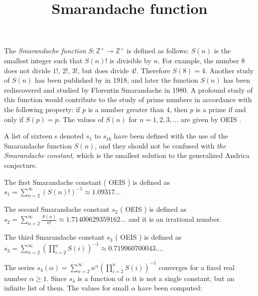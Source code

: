 \documentclass[12pt]{article}
\begin{document}
\title{Smarandache function}

The \emph{Smarandache function} $S \colon \mathbb{Z}^+ \to \mathbb{Z}^+$ is defined as follows: $S(n)$ is the smallest integer such that $S(n)!$ is divisible by $n$. For example, the number 8 does not divide $1!$, $2!$, $3!$, but does divide $4!$. Therefore $S(8)=4$. Another study of $S(n)$ has been published by  in 1918, and later the function $S(n)$ has been rediscovered and studied by Florentin Smarandache in 1980. A profound study of this function would contribute to the study of prime numbers in accordance with the following property: if $p$ is a number greater than $4$, then $p$ is a prime if and only if $S(p)=p$. The values of $S(n)$ for $n=1,2,3, \ldots$ are given by  OEIS .

A list of sixteen s denoted $s_1$ to $s_{16}$ have been defined with the use of the Smarandache function $S(n)$, and they should not be confused with \emph{the Smarandache constant}, which is the smallest solution to the generalized Andrica conjecture.

The first Smarandache constant ( OEIS ) is defined as $\displaystyle s_1=\sum_{n=2}^{\infty}\left(S(n)!\right)^{-1} \approx 1.09317 \ldots$ 

The second Smarandache constant $s_2$ ( OEIS ) is defined as $\displaystyle s_2=\sum_{n=2}^{\infty}\frac{S(n)}{n!}\approx 1.71400629359162 \ldots$ and it is an irrational number.

The third Smarandache constant $s_3$ ( OEIS ) is defined as $\displaystyle s_3=\sum_{n=2}^{\infty}\left(\prod_{i=2}^{n}S(i)\right)^{-1}\approx 0.719960700043 \ldots$.

The series $\displaystyle s_4(\alpha)=\sum_{n=2}^{\infty}n^{\alpha}\left(\prod_{i=2}^{n}S(i)\right)^{-1}$ converges for a fixed real number $\alpha \geq 1$. Since $s_4$ is a function of $\alpha$ it is not a single constant, but an infinite list of them. The values for small $\alpha$ have been computed:
\end{document}
